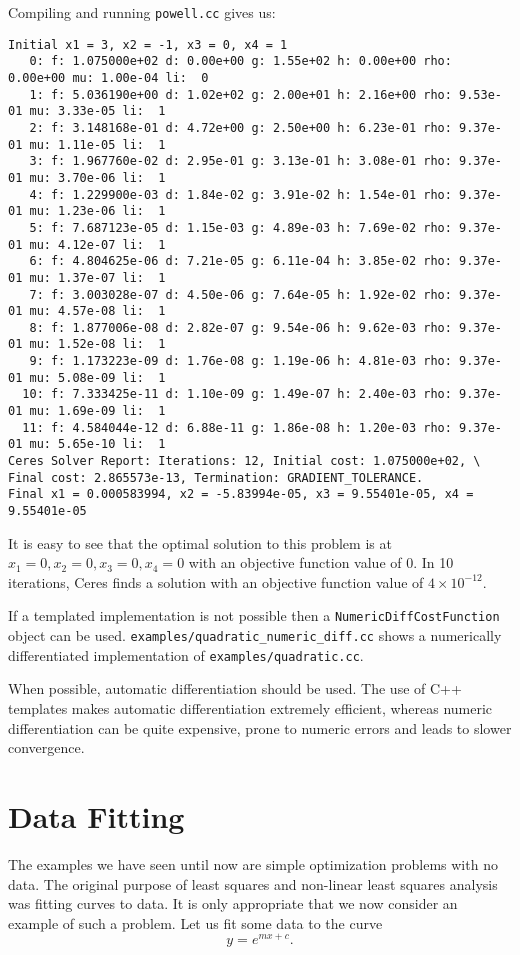 Compiling and running \texttt{powell.cc} gives us:
\begin{verbatim}
Initial x1 = 3, x2 = -1, x3 = 0, x4 = 1
   0: f: 1.075000e+02 d: 0.00e+00 g: 1.55e+02 h: 0.00e+00 rho: 0.00e+00 mu: 1.00e-04 li:  0
   1: f: 5.036190e+00 d: 1.02e+02 g: 2.00e+01 h: 2.16e+00 rho: 9.53e-01 mu: 3.33e-05 li:  1
   2: f: 3.148168e-01 d: 4.72e+00 g: 2.50e+00 h: 6.23e-01 rho: 9.37e-01 mu: 1.11e-05 li:  1
   3: f: 1.967760e-02 d: 2.95e-01 g: 3.13e-01 h: 3.08e-01 rho: 9.37e-01 mu: 3.70e-06 li:  1
   4: f: 1.229900e-03 d: 1.84e-02 g: 3.91e-02 h: 1.54e-01 rho: 9.37e-01 mu: 1.23e-06 li:  1
   5: f: 7.687123e-05 d: 1.15e-03 g: 4.89e-03 h: 7.69e-02 rho: 9.37e-01 mu: 4.12e-07 li:  1
   6: f: 4.804625e-06 d: 7.21e-05 g: 6.11e-04 h: 3.85e-02 rho: 9.37e-01 mu: 1.37e-07 li:  1
   7: f: 3.003028e-07 d: 4.50e-06 g: 7.64e-05 h: 1.92e-02 rho: 9.37e-01 mu: 4.57e-08 li:  1
   8: f: 1.877006e-08 d: 2.82e-07 g: 9.54e-06 h: 9.62e-03 rho: 9.37e-01 mu: 1.52e-08 li:  1
   9: f: 1.173223e-09 d: 1.76e-08 g: 1.19e-06 h: 4.81e-03 rho: 9.37e-01 mu: 5.08e-09 li:  1
  10: f: 7.333425e-11 d: 1.10e-09 g: 1.49e-07 h: 2.40e-03 rho: 9.37e-01 mu: 1.69e-09 li:  1
  11: f: 4.584044e-12 d: 6.88e-11 g: 1.86e-08 h: 1.20e-03 rho: 9.37e-01 mu: 5.65e-10 li:  1
Ceres Solver Report: Iterations: 12, Initial cost: 1.075000e+02, \
Final cost: 2.865573e-13, Termination: GRADIENT_TOLERANCE.
Final x1 = 0.000583994, x2 = -5.83994e-05, x3 = 9.55401e-05, x4 = 9.55401e-05
\end{verbatim}
It is easy to see that the  optimal solution to this problem is at $x_1=0, x_2=0, x_3=0, x_4=0$ with an objective function value of $0$. In 10 iterations, Ceres finds a solution with an objective function value of $4\times 10^{-12}$.

If a templated implementation is not possible then a \texttt{NumericDiffCostFunction} object can be used. \texttt{examples/quadratic\_numeric\_diff.cc} shows a numerically differentiated implementation of \texttt{examples/quadratic.cc}.

When possible, automatic differentiation should be used. The use of
C++ templates makes automatic differentiation extremely efficient,
whereas numeric differentiation can be quite expensive, prone to
numeric errors and leads to slower convergence.

\section{Data Fitting}
\label{sec:tutorial:datafitting}
The examples we have seen until now are simple optimization problems with no data. The original purpose of least squares and non-linear least squares analysis was fitting curves to data. It is only appropriate that we now consider an example of such a problem. Let us fit some data to the curve
\begin{equation}
	y = e^{mx + c}.
\end{equation}

